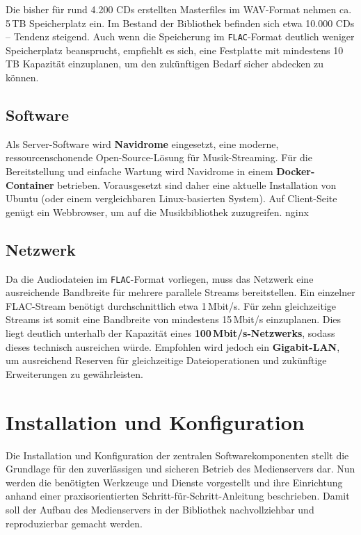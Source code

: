 \documentclass[12pt,a4paper]{report}
\begin{document}
  Die bisher für rund 4.200 CDs erstellten Masterfiles im \ac{WAV}-Format nehmen ca. 5\,TB Speicherplatz ein. 
  Im Bestand der Bibliothek befinden sich etwa 10.000 CDs – Tendenz steigend. 
  Auch wenn die Speicherung im \texttt{\ac{FLAC}}-Format deutlich weniger Speicherplatz beansprucht, 
  empfiehlt es sich, eine Festplatte mit mindestens 10\,TB Kapazität einzuplanen, um den zukünftigen Bedarf sicher abdecken zu können.

  \subsection{Software}
  Als Server-Software wird \textbf{Navidrome} eingesetzt, eine moderne, ressourcenschonende Open-Source-Lösung für Musik-Streaming. 
  Für die Bereitstellung und einfache Wartung wird Navidrome in einem \textbf{Docker-Container} betrieben. 
  Vorausgesetzt sind daher eine aktuelle Installation von Ubuntu (oder einem vergleichbaren Linux-basierten System). 
  Auf Client-Seite genügt ein Webbrowser, um auf die Musikbibliothek zuzugreifen. nginx

  \subsection{Netzwerk}
  Da die Audiodateien im \texttt{\ac{FLAC}}-Format vorliegen, muss das Netzwerk eine ausreichende Bandbreite für mehrere parallele Streams bereitstellen. 
  Ein einzelner \ac{FLAC}-Stream benötigt durchschnittlich etwa 1\,Mbit/s. 
  Für zehn gleichzeitige Streams ist somit eine Bandbreite von mindestens 15\,Mbit/s einzuplanen. 
  Dies liegt deutlich unterhalb der Kapazität eines \textbf{100\,Mbit/s-Netzwerks}, sodass dieses technisch ausreichen würde. 
  Empfohlen wird jedoch ein \textbf{Gigabit-LAN}, um ausreichend Reserven für gleichzeitige Dateioperationen und zukünftige Erweiterungen zu gewährleisten.

\section{Installation und Konfiguration}  
Die Installation und Konfiguration der zentralen Softwarekomponenten stellt die Grundlage für den zuverlässigen und sicheren Betrieb des Medienservers dar.
Nun werden die benötigten Werkzeuge und Dienste vorgestellt und ihre Einrichtung anhand einer praxisorientierten Schritt-für-Schritt-Anleitung beschrieben.
Damit soll der Aufbau des Medienservers in der Bibliothek nachvollziehbar und reproduzierbar gemacht werden.
\end{document}
